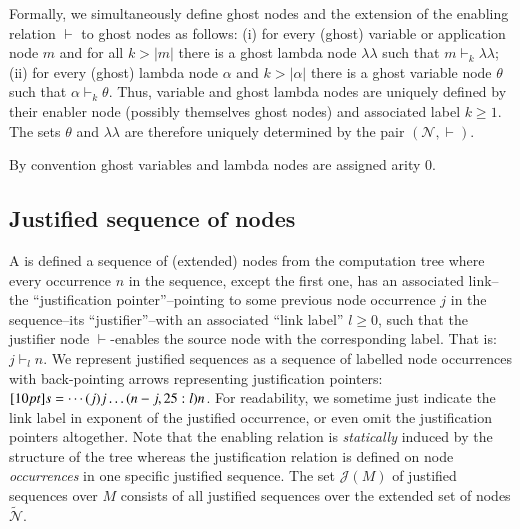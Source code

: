 \documentclass{elsarticle}
\theoremstyle{plain}
\theoremstyle{definition}
\theoremstyle{remark}
\newcommand\Nodes{\mathcal{N}}%
\newcommand\ExtendedNodes{\tilde{\Nodes}}
\newcommand{\ghostlmd}{{\lambda\!\!\lambda}}
\newcommand{\ghostvar}{\theta}
\newcommand{\enables}{\vdash} %
\def\justseqset{\mathcal{J}}
\begin{document}
Formally, we simultaneously define ghost nodes and the extension of the enabling relation $\enables$ to ghost nodes as follows: (i) for every (ghost) variable or application node $m$ and for all $k>|m|$ there is a ghost lambda node $\ghostlmd$ such that $m \enables_k \ghostlmd$; (ii) for every (ghost) lambda node $\alpha$ and $k>|\alpha|$ there is a ghost variable node $\ghostvar$ such that $\alpha \enables_k \ghostvar$. Thus, variable and ghost lambda nodes are uniquely defined by their enabler node (possibly themselves ghost nodes) and associated label $k\geq 1$.
The sets $\ghostvar$ and $\ghostlmd$ are therefore uniquely determined by the pair $(\Nodes, \enables)$.

By convention ghost variables and lambda nodes are assigned arity $0$.

\subsection{Justified sequence of nodes}
\label{sec:justseq}

A  is defined a sequence of (extended) nodes from the computation tree where every occurrence $n$ in the sequence, except the first one, has an associated link--the ``justification pointer''--pointing to some previous node occurrence $j$ in the sequence--its ``justifier''--with an associated ``link label'' $l\geq0$, such that the justifier node $\enables$-enables the source node with the corresponding label. That is: $j \enables_l n$. We represent justified sequences as a sequence of labelled node occurrences with back-pointing arrows representing justification pointers:
$\Pstr[10pt]{ s = \cdots (j){j} \ldots (n-j,25:l){n} }$.
For readability, we sometime just indicate the link label in exponent of the justified occurrence, or even omit the justification pointers altogether.
Note that the enabling relation is \emph{statically} induced by the structure of the tree whereas the justification relation is defined on node \emph{occurrences} in one specific justified sequence. The set $\justseqset(M)$ of justified sequences over $M$ consists of all justified sequences over the extended set of nodes $\ExtendedNodes$.
\end{document}
